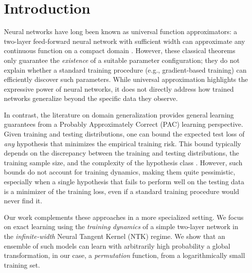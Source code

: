 \section{Introduction}
Neural networks have long been known as universal function approximators: a two-layer feed-forward neural network with sufficient width can approximate any continuous function on a compact domain \citep{cybenkoUniversal, HORNIK1989359}. However, these classical theorems only guarantee the \emph{existence} of a suitable parameter configuration; they do not explain whether a standard training procedure (e.g., gradient-based training) can efficiently discover such parameters. While universal approximation highlights the expressive power of neural networks, it does not directly address how trained networks generalize beyond the specific data they observe. 

In contrast, the literature on domain generalization provides general learning guarantees from a Probably Approximately Correct (PAC) learning perspective. Given training and testing distributions, one can bound the expected test loss of \emph{any} hypothesis that minimizes the empirical training risk. This bound typically depends on the discrepancy between the training and testing distributions, the training sample size, and the complexity of the hypothesis class \citep{NIPS2006_b1b0432c, mohriadapt}. However, such bounds do not account for training dynamics, making them quite pessimistic, especially when a single hypothesis that fails to perform well on the testing data is a minimizer of the training loss, even if a standard training procedure would never find it. 

Our work complements these approaches in a more specialized setting. We focus on exact learning using the \emph{training dynamics} of a simple two-layer network in the \emph{infinite-width} Neural Tangent Kernel (NTK) regime. We show that an ensemble of such models can learn with arbitrarily high probability a global transformation, in our case, a \emph{permutation} function, from a logarithmically small training set.

%

%

